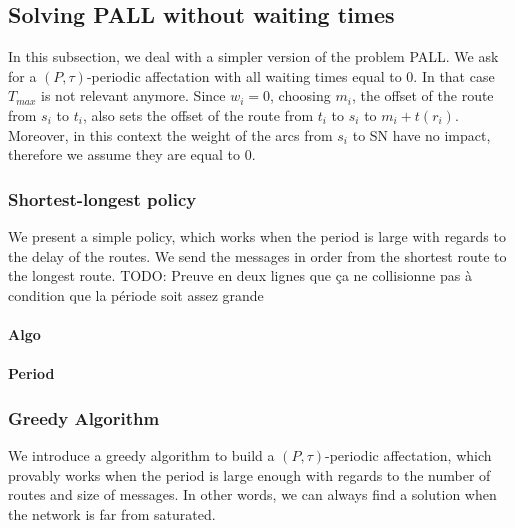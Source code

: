 \documentclass[a4paper,10pt]{article}
\newcommand{\todo}[1]{{\color{red} TODO: {#1}}}
\begin{document}
      
%       
      

  \subsection{Solving PALL without waiting times}
  
  In this subsection, we deal with a simpler version of the problem PALL.
  We ask for a $(P,\tau)$-periodic affectation with all waiting times equal to $0$. 
  In that case $T_{max}$ is not relevant anymore. Since $w_i=0$, choosing $m_i$, the offset of the route from
  $s_i$ to $t_i$, also sets the offset of the route from $t_i$ to $s_i$ to $m_i + t(r_i)$.
  Moreover, in this context the weight of the arcs from $s_i$ to SN have no impact, therefore we assume they are 
  equal to $0$.
 
  
    \subsubsection{Shortest-longest policy}
    
    We present a simple policy, which works when the period is large with regards to the delay of the routes.
    We send the messages in order from the shortest route to the longest route. 
    \todo{Preuve en deux lignes que ça ne collisionne pas à condition que la période soit assez grande}
    
    
      \paragraph{Algo}
      \paragraph{Period}
      
      
    \subsubsection{Greedy Algorithm}
    
    We introduce a greedy algorithm to build a $(P,\tau)$-periodic affectation, which provably works when
    the period is large enough with regards to the number of routes and size of messages. In other words, 
    we can always find a solution when the network is far from saturated. 
    
\end{document}
